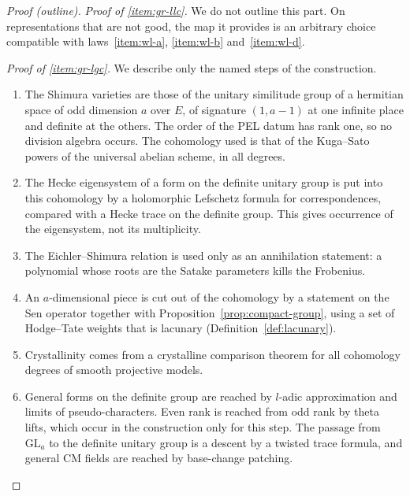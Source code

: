 \documentclass[11pt]{amsbook}
\theoremstyle{plain}
\theoremstyle{definition}
\theoremstyle{remark}
\numberwithin{equation}{section}
\numberwithin{figure}{chapter}
\numberwithin{table}{chapter}
\begin{document}
\begin{proof}[Proof (outline)]
\noindent\emph{Proof of \ref{item:gr-llc}.} We do not outline this
part. On representations that are not good, the map it provides is
an arbitrary choice compatible with laws~\ref{item:wl-a},
\ref{item:wl-b} and~\ref{item:wl-d}.

\noindent\emph{Proof of \ref{item:gr-lgc}.}
We describe only the named steps of the construction.
\begin{enumerate}[label=(\arabic*)]
\item\label{item:gr-s1}
The Shimura varieties are those of the unitary similitude group
of a hermitian space of odd dimension $a$ over $E$, of signature
$(1,a-1)$ at one infinite place and definite at the others. The order
of the PEL datum has rank one, so no division algebra occurs. The
cohomology used is that of the Kuga--Sato powers of the universal
abelian scheme, in all degrees.
\item\label{item:gr-s2}
The Hecke eigensystem of a form on the definite unitary group is
put into this cohomology by a holomorphic Lefschetz formula for
correspondences, compared with a Hecke trace on the definite group.
This gives occurrence of the eigensystem, not its multiplicity.
\item\label{item:gr-s3}
The Eichler--Shimura relation is used only as an annihilation
statement: a polynomial whose roots are the Satake parameters kills
the Frobenius.
\item\label{item:gr-s4}
An $a$-dimensional piece is cut out of the cohomology by a
statement on the Sen operator together with
Proposition~\ref{prop:compact-group}, using a set of Hodge--Tate
weights that is lacunary (Definition~\ref{def:lacunary}).
\item Crystallinity comes from a crystalline comparison theorem for all
cohomology degrees of smooth projective models.
\item\label{item:gr-s6}
General forms on the definite group are reached by $l$-adic
approximation and limits of pseudo-characters. Even rank is reached
from odd rank by theta lifts, which occur in the construction only for
this step. The passage from $\mathrm{GL}_a$ to the definite unitary
group is a descent by a twisted trace formula, and general CM fields
are reached by base-change patching.
\end{enumerate}
\end{proof}
\end{document}

